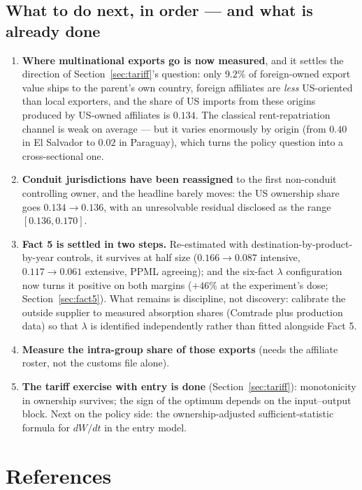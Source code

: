 \documentclass[11pt]{article}
\theoremstyle{plain}
\theoremstyle{remark}
\theoremstyle{definition}
\begin{document}
\subsection{What to do next, in order --- and what is already done}

\begin{enumerate}
\item \textbf{Where multinational exports go is now measured}, and it settles the
direction of Section~\ref{sec:tariff}'s question: only $9.2\%$ of foreign-owned export
value ships to the parent's own country, foreign affiliates are \emph{less} US-oriented
than local exporters, and the share of US imports from these origins produced by
US-owned affiliates is $0.134$. The classical rent-repatriation channel is weak on
average --- but it varies enormously by origin (from $0.40$ in El Salvador to $0.02$
in Paraguay), which turns the policy question into a cross-sectional one.
\item \textbf{Conduit jurisdictions have been reassigned} to the first non-conduit
controlling owner, and the headline barely moves: the US ownership share goes
$0.134\to0.136$, with an unresolvable residual disclosed as the range $[0.136,0.170]$.
\item \textbf{Fact 5 is settled in two steps.} Re-estimated with
destination-by-product-by-year controls, it survives at half size ($0.166\to0.087$
intensive, $0.117\to0.061$ extensive, PPML agreeing); and the six-fact $\lambda$
configuration now turns it positive on both margins ($+46\%$ at the experiment's dose;
Section~\ref{sec:fact5}). What remains is discipline, not discovery: calibrate the
outside supplier to measured absorption shares (Comtrade plus production data) so that
$\lambda$ is identified independently rather than fitted alongside Fact 5.
\item \textbf{Measure the intra-group share of those exports} (needs the affiliate
roster, not the customs file alone).
\item \textbf{The tariff exercise with entry is done} (Section~\ref{sec:tariff}):
monotonicity in ownership survives; the sign of the optimum depends on the
input--output block. Next on the policy side: the ownership-adjusted
sufficient-statistic formula for $dW/dt$ in the entry model.
\end{enumerate}

\newpage
\section*{References}
\label{sec:refs}
\end{document}
